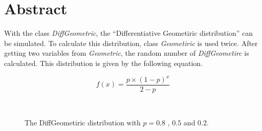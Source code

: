 %

\section{Abstract}

\noindent
With the class {\em DiffGeometric}, the ``Differentiative Geometiric
distribution'' can be simulated. To calculate this distribution, class
{\em Geometiric} is used twice. After getting two variables from {\em
Geometric}, the random number of {\em DiffGeometirc} is
calculated. This distribution is given by the following equation.

\vspace*{10mm}

\begin{equation}
f(x) = \frac{p \times (1-p)^x}{2-p}
\end{equation}

\vspace*{10mm}

\begin{center}
\begin{figure}[h]
\\
\caption{The DiffGeometiric distribution with $p = 0.8$ , $0.5$
and $0.2$.}
\end{figure}
\end{center}

